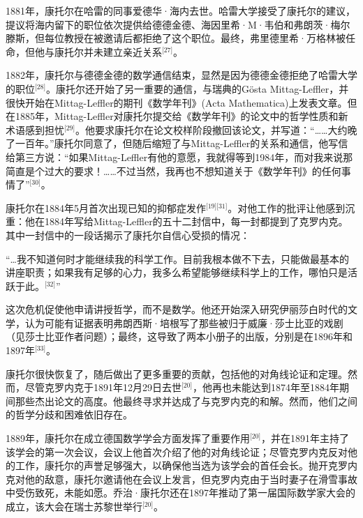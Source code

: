 1881年，康托尔在哈雷的同事爱德华·海内去世。哈雷大学接受了康托尔的建议，提议将海内留下的职位依次提供给德德金德、海因里希·M·韦伯和弗朗茨·梅尔滕斯，但每位教授在被邀请后都拒绝了这个职位。最终，弗里德里希·万格林被任命，但他与康托尔并未建立亲近关系\(^\text{[27]}\)。

1882年，康托尔与德德金德的数学通信结束，显然是因为德德金德拒绝了哈雷大学的职位\(^\text{[28]}\)。康托尔还开始了另一重要的通信，与瑞典的Gösta Mittag-Leffler，并很快开始在Mittag-Leffler的期刊《数学年刊》(Acta Mathematica)上发表文章。但在1885年，Mittag-Leffler对康托尔提交给《数学年刊》的论文中的哲学性质和新术语感到担忧\(^\text{[29]}\)。他要求康托尔在论文校样阶段撤回该论文，并写道：“……大约晚了一百年。”康托尔同意了，但随后缩短了与Mittag-Leffler的关系和通信，他写信给第三方说：“如果Mittag-Leffler有他的意愿，我就得等到1984年，而对我来说那简直是个过大的要求！……不过当然，我再也不想知道关于《数学年刊》的任何事情了”\(^\text{[30]}\)。

康托尔在1884年5月首次出现已知的抑郁症发作\(^\text{[19][31]}\)。对他工作的批评让他感到沉重：他在1884年写给Mittag-Leffler的五十二封信中，每一封都提到了克罗内克。其中一封信中的一段话揭示了康托尔自信心受损的情况：

“…我不知道何时才能继续我的科学工作。目前我根本做不下去，只能做最基本的讲座职责；如果我有足够的心力，我多么希望能够继续科学上的工作，哪怕只是活跃于此。\(^\text{[32]}\)”

这次危机促使他申请讲授哲学，而不是数学。他还开始深入研究伊丽莎白时代的文学，认为可能有证据表明弗朗西斯·培根写了那些被归于威廉·莎士比亚的戏剧（见莎士比亚作者问题）；最终，这导致了两本小册子的出版，分别是在1896年和1897年\(^\text{[33]}\)。

康托尔很快恢复了，随后做出了更多重要的贡献，包括他的对角线论证和定理。然而，尽管克罗内克于1891年12月29日去世\(^\text{[20]}\)，他再也未能达到1874年至1884年期间那些杰出论文的高度。他最终寻求并达成了与克罗内克的和解。然而，他们之间的哲学分歧和困难依旧存在。

1889年，康托尔在成立德国数学学会方面发挥了重要作用\(^\text{[20]}\)，并在1891年主持了该学会的第一次会议，会议上他首次介绍了他的对角线论证；尽管克罗内克反对他的工作，康托尔的声誉足够强大，以确保他当选为该学会的首任会长。抛开克罗内克对他的敌意，康托尔邀请他在会议上发言，但克罗内克由于当时妻子在滑雪事故中受伤致死，未能如愿。乔治·康托尔还在1897年推动了第一届国际数学家大会的成立，该大会在瑞士苏黎世举行\(^\text{[20]}\)。
